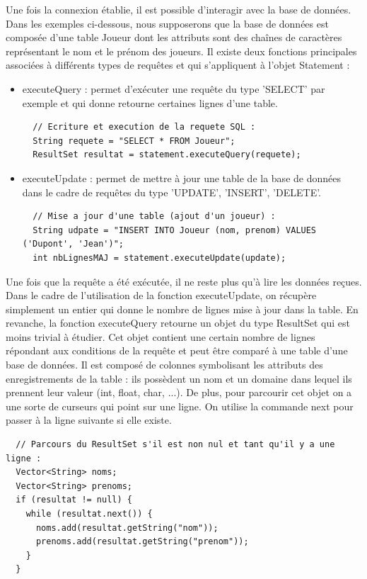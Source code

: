 %
Une fois la connexion établie, il est possible d'interagir avec la base de données. Dans les exemples ci-dessous, nous supposerons que la base de données
est composée d'une table Joueur dont les attributs sont des chaînes de caractères représentant le nom et le prénom des joueurs. Il existe deux fonctions
principales associées à différents types de requêtes et qui s'appliquent à l'objet Statement :
\begin{itemize}
 \item executeQuery : permet d'exécuter une requête du type 'SELECT' par exemple et qui donne retourne certaines lignes d'une table.
  \begin{lstlisting}  
  // Ecriture et execution de la requete SQL :
  String requete = "SELECT * FROM Joueur";
  ResultSet resultat = statement.executeQuery(requete);
  \end{lstlisting}
 \item executeUpdate : permet de mettre à jour une table de la base de données dans le cadre de requêtes du type 'UPDATE', 'INSERT', 'DELETE'.
  \begin{lstlisting}
  // Mise a jour d'une table (ajout d'un joueur) :
  String udpate = "INSERT INTO Joueur (nom, prenom) VALUES ('Dupont', 'Jean')";
  int nbLignesMAJ = statement.executeUpdate(update);
  \end{lstlisting}
\end{itemize}

Une fois que la requête a été exécutée, il ne reste plus qu'à lire les données reçues. Dans le cadre de l'utilisation de la fonction executeUpdate, on récupère
simplement un entier qui donne le nombre de lignes mise à jour dans la table. En revanche, la fonction executeQuery retourne un objet du type ResultSet qui
est moins trivial à étudier. Cet objet contient une certain nombre de lignes répondant aux conditions de la requête et peut être comparé à une table d'une base de données.
Il est composé de colonnes symbolisant les attributs des enregistrements de la table : ils possèdent un nom et un domaine dans lequel ils prennent leur valeur (int, float, char, ...).
De plus, pour parcourir cet objet on a une sorte de curseurs qui point sur une ligne. On utilise la commande next pour passer à la ligne suivante si elle existe.

\begin{lstlisting}  
  // Parcours du ResultSet s'il est non nul et tant qu'il y a une ligne :
  Vector<String> noms;
  Vector<String> prenoms;
  if (resultat != null) {
    while (resultat.next()) {
      noms.add(resultat.getString("nom"));
      prenoms.add(resultat.getString("prenom"));
    }
  }
\end{lstlisting}


